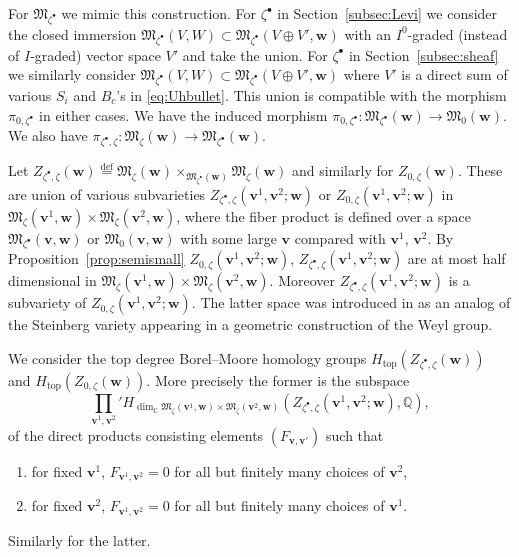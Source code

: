 \documentclass[pdftex]{sigma}
\theoremstyle{definition}
\numberwithin{equation}{section}
\newcommand{\propref}[1]{Proposition~\ref{#1}}
\newcommand{\subsecref}[1]{Section~\ref{#1}}
\newcommand{\defeq}{\overset{\operatorname{\scriptstyle def}}{=}}
\newcommand{\C}{{\mathbb C}}
\newcommand{\Q}{{\mathbb Q}}
\newcommand{\M}{{\mathfrak M}} %
\newcommand{\bv}{{\mathbf v}} %
\newcommand{\bw}{{\mathbf w}} %
\newcommand{\topdeg}{{\operatorname{top}}} %
\begin{document}
For $\M_{\zeta^\bullet}$ we mimic this construction. For
$\zeta^\bullet$ in \subsecref{subsec:Levi} we consider the closed
immersion $\M_{\zeta^\bullet}(V,W)\subset\M_{\zeta^\bullet}(V\oplus
V',\bw)$ with an $I^0$-graded (instead of $I$-graded) vector space
$V'$ and take the union. For $\zeta^\bullet$ in
\subsecref{subsec:sheaf} we similarly consider
$\M_{\zeta^\bullet}(V,W)\subset\M_{\zeta^\bullet}(V\oplus V',\bw)$
where $V'$ is a direct sum of various $S_i$ and $B_c$'s in
\eqref{eq:Uhbullet}.
This union is compatible with the morphism $\pi_{0,\zeta^\bullet}$ in
either cases. We have the induced morphism
$\pi_{0,\zeta^\bullet}\colon \M_{\zeta^\bullet}(\bw)\to \M_0(\bw)$. We
also have $\pi_{\zeta^\bullet,\zeta}\colon
\M_{\zeta}(\bw)\to\M_{\zeta^\bullet}(\bw)$.

Let
\(
  Z_{\zeta^\bullet,\zeta}(\bw) \defeq
  \M_{\zeta}(\bw)\times_{\M_{\zeta^\bullet}(\bw)} \M_\zeta(\bw)
\)
and similarly for $Z_{0,\zeta}(\bw)$. These are union of various
subvarieties $Z_{\zeta^\bullet,\zeta}(\bv^1,\bv^2;\bw)$
or $Z_{0,\zeta}(\bv^1,\bv^2;\bw)$
in $\M_\zeta(\bv^1,\bw)\times\M_\zeta(\bv^2,\bw)$, where the f\/iber
product is def\/ined over a space $\M_{\zeta^\bullet}(\bv,\bw)$
or $\M_0(\bv,\bw)$ with some large $\bv$ compared with $\bv^1$, $\bv^2$.
%
By \propref{prop:semismall} $Z_{0,\zeta}(\bv^1,\bv^2;\bw)$,
$Z_{\zeta^\bullet,\zeta}(\bv^1,\bv^2;\bw)$ are at most
half dimensional in $\M_\zeta(\bv^1,\bw)\times\M_\zeta(\bv^2,\bw)$.
%
Moreover $Z_{\zeta^\bullet,\zeta}(\bv^1,\bv^2;\bw)$ is a subvariety of
$Z_{0,\zeta}(\bv^1,\bv^2;\bw)$.
%
The latter space was introduced in \cite{Na-alg} as an analog of the
Steinberg variety appearing in a geometric construction of the Weyl group.

We consider the top degree Borel--Moore homology groups
$H_\topdeg(Z_{\zeta^\bullet,\zeta}(\bw))$ and
$H_\topdeg(Z_{0,\zeta}(\bw))$. More precisely the former is the subspace
\[
\prod_{\bv^1,\bv^2}' H_{\dim_\C \M_\zeta(\bv^1,\bw)\times\M_\zeta(\bv^2,\bw)}
(Z_{\zeta^\bullet,\zeta}(\bv^1,\bv^2;\bw),\Q),
\]
of the direct products consisting elements $(F_{\bv,\bv'})$ such
that{\samepage
\begin{enumerate}\itemsep=0pt
\item[1)] for f\/ixed $\bv^1$, $F_{\bv^1,\bv^2} = 0$ for all but f\/initely
many choices of $\bv^2$,
\item[2)] for f\/ixed $\bv^2$, $F_{\bv^1,\bv^2} = 0$  for all but f\/initely
many choices of $\bv^1$.
\end{enumerate}
Similarly for the latter.}
\end{document}

